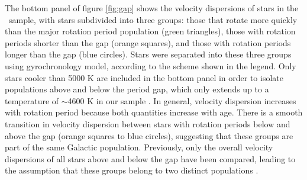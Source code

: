 The bottom panel of figure \ref{fig:gap} shows the velocity dispersions of
stars in the \mct\ sample, with stars subdivided into three groups: those that
rotate more quickly than the major rotation period population (green
triangles), those with rotation periods shorter than the gap (orange squares),
and those with rotation periods longer than the gap (blue circles).
Stars were separated into these three groups using \citet{angus2019}
gyrochronology model, according to the scheme shown in the legend.
Only stars cooler than 5000 K are included in the bottom panel in order to
isolate populations above and below the period gap, which only extends up to a
temperature of $\sim$4600 K in our sample \citep[Although][found that the gap
extends to temperatures as hot as 6000 K]{davenport2017}.
In general, velocity dispersion increases with rotation period because both
quantities increase with age.
There is a smooth transition in velocity dispersion between stars with
rotation periods below and above the gap (orange squares to blue circles),
suggesting that these groups are part of the same Galactic population.
Previously, only the overall velocity dispersions of all stars above and below
the gap have been compared, leading to the assumption that these groups belong
to two distinct populations \citep{mcquillan2014}.

